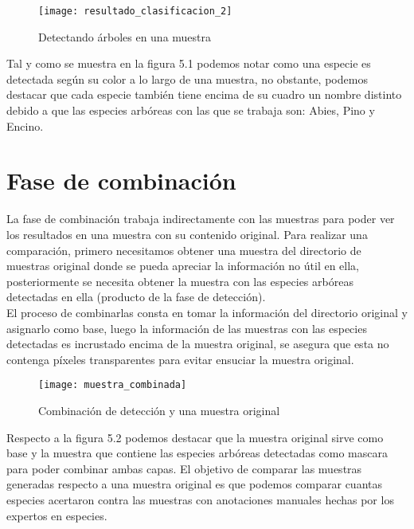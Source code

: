 \begin{figure}[H]
  \centering
  \begin{minipage}[b]{0.8\textwidth}
        \texttt{[image: resultado\_clasificacion\_2]}
    \caption{Detectando árboles en una muestra}
  \end{minipage}
\end{figure}

Tal y como se muestra en la figura 5.1  podemos notar como una especie es detectada según su color a lo largo de una muestra, no obstante, podemos destacar que cada especie también tiene encima de su cuadro un nombre distinto debido a que las especies arbóreas con las que se trabaja son: Abies, Pino y Encino. 

\section{Fase de combinación}
La fase de combinación trabaja indirectamente con las muestras para poder ver los resultados en una muestra con su contenido original. Para realizar una comparación, primero necesitamos obtener una muestra del directorio de muestras original donde se pueda apreciar la información no útil en ella, posteriormente se necesita obtener la muestra con las especies arbóreas detectadas en ella (producto de la fase de detección).\\ 

El proceso de combinarlas consta en tomar la información del directorio original y asignarlo como base, luego la información de las muestras con las especies detectadas es incrustado encima de la muestra original, se asegura que esta no contenga píxeles transparentes para evitar ensuciar la muestra original.


\begin{figure}[H]
  \centering
  \begin{minipage}[b]{0.8\textwidth}
        \texttt{[image: muestra\_combinada]}
    \caption{Combinación de detección y una muestra original}
  \end{minipage}
\end{figure}
\newpage

Respecto a la figura 5.2 podemos destacar que la muestra original sirve como base y la muestra que contiene las especies arbóreas detectadas como mascara para poder combinar ambas capas. El objetivo de comparar las muestras generadas respecto a una muestra original es que podemos comparar cuantas especies acertaron contra las muestras con anotaciones manuales hechas por los expertos en especies.

